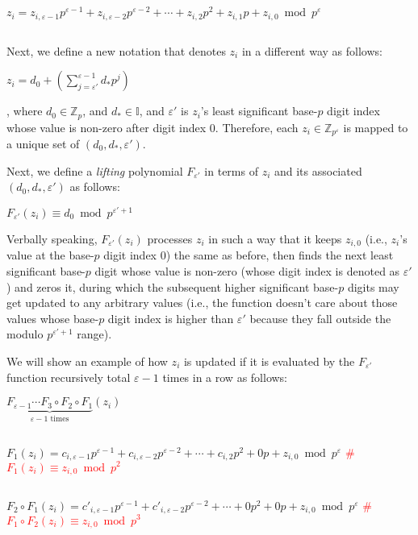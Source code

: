 $z_i = z_{i, \varepsilon-1}p^{\varepsilon-1} + z_{i, \varepsilon-2}p^{\varepsilon-2} + \cdots + z_{i, 2}p^2 + z_{i, 1}p + z_{i, 0} \bmod p^\varepsilon$

$ $

Next, we define a new notation that denotes $z_i$ in a different way as follows: 

$z_i = d_0 + \left(\sum\limits_{j=\varepsilon'}^{\varepsilon-1} d_* p^j\right)$

, where $d_0 \in \mathbb{Z}_p$, and $d_* \in \mathbb{I}$, and $\varepsilon'$ is $z_i$'s least significant base-$p$ digit index whose value is non-zero after digit index 0. Therefore, each $z_i \in \mathbb{Z}_{p^\varepsilon}$ is mapped to a unique set of $(d_0, d_*, \varepsilon')$. 


Next, we define a \textit{lifting} polynomial $F_{\varepsilon'}$ in terms of $z_i$ and its associated $(d_0, d_*, \varepsilon')$ as follows:

$F_{\varepsilon'}(z_i) \equiv d_0 \bmod p^{\varepsilon'+1}$

Verbally speaking, $F_{\varepsilon'}(z_i)$ processes $z_i$ in such a way that it keeps $z_{i,0}$ (i.e., $z_{i}$'s value at the base-$p$ digit index 0) the same as before, then finds the next least significant base-$p$ digit whose value is non-zero (whose digit index is denoted as $\varepsilon'$) and zeros it, during which the subsequent higher significant base-$p$ digits may get updated to any arbitrary values (i.e., the function doesn't care about those values whose base-$p$ digit index is higher than $\varepsilon'$ because they fall outside the modulo $p^{\varepsilon' + 1}$ range). 

We will show an example of how $z_i$ is updated if it is evaluated by the $F_{\varepsilon'}$ function recursively total $\varepsilon-1$ times in a row as follows:

$\underbrace{F_{\varepsilon-1} \cdots F_{3} \circ F_{2} \circ  F_{1}}_{\varepsilon-1 \text{ times}}(z_i)$

$ $

 $F_{1}(z_i) = c_{i,\varepsilon-1}p^{\varepsilon-1} + c_{i,\varepsilon-2}p^{\varepsilon-2} + \cdots + c_{i, 2}p^2 + 0p + z_{i, 0} \bmod p^\varepsilon$ \textcolor{red}{ \# $F_{1}(z_i) \equiv z_{i,0} \bmod p^2$}

$ $

 $F_{2} \circ F_{1}(z_i) = c'_{i,\varepsilon-1}p^{\varepsilon-1} + c'_{i,\varepsilon-2}p^{\varepsilon-2} + \cdots + 0p^2 + 0p + z_{i, 0} \bmod p^\varepsilon$  \textcolor{red}{ \# $F_{1} \circ F_{2}(z_i) \equiv z_{i,0} \bmod p^3$} 

